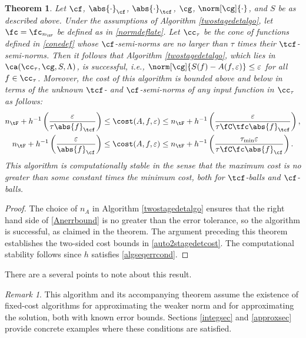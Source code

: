 \documentclass[]{elsarticle}
\newtheorem{theorem}{Theorem}
\theoremstyle{definition}
\theoremstyle{remark}
\newtheorem{rem}{Remark}
\newcommand{\Fnorm}[1]{\abs{#1}_{\cf}}
\newcommand{\Ftnorm}[1]{\abs{#1}_{\tcf}}
\newcommand{\Gnorm}[1]{\norm[\cg]{#1}}
\begin{document}
\begin{theorem}  \label{TwoStageDetermThm}  Let $\cf$, $\Fnorm{\cdot}$, $\Ftnorm{\cdot}$, $\cg$, $\Gnorm{\cdot}$, and $S$ be as described above.  Under the assumptions of Algorithm  \ref{twostagedetalgo}, let $\fc=\fc_{n_{\tF}}$ be defined as in \eqref{normdeflate}.
Let $\cc_\tau$ be the cone of functions defined in \eqref{conedef} whose $\cf$-semi-norms are no larger than $\tau$ times their $\tcf$-semi-norms.  Then it follows that Algorithm \ref{twostagedetalgo}, which lies in $\ca(\cc_{\tau},\cg,S,\Lambda)$, is successful,  i.e.,  $\norm[\cg]{S(f)-A(f,\varepsilon)} \le \varepsilon$ for all $f \in \cc_\tau$.  Moreover, the cost of this algorithm is bounded above and below in terms of the unknown $\tcf$- and $\cf$-semi-norms of any input function in $\cc_{\tau}$ as follows:
\begin{subequations}  \label{auto2stagedetcost}
\begin{gather}
n_{\tF}+ h^{-1}\left(\frac{\varepsilon}{\tau \Ftnorm{f}} \right) \le 
\cost(A,f,\varepsilon)
\le n_{\tF}+ h^{-1}\left(\frac{\varepsilon}{\tau \fC\tfc\Ftnorm{f}}\right), \\
n_{\tF}+ h^{-1}\left(\frac{\varepsilon}{\Fnorm{f}} \right) \le \cost(A,f,\varepsilon)
\le n_{\tF}+h^{-1}\left(\frac{\tau_{\min}\varepsilon}{\tau \fC\fc\Fnorm{f}}\right).
\end{gather}
\end{subequations}
This algorithm is computationally stable in the sense that the maximum cost is no greater than some constant times the minimum cost, both for $\tcf$-balls and $\cf$-balls.
\end{theorem}

\begin{proof} The choice of $n_A$ in Algorithm \ref{twostagedetalgo} ensures that the right hand side of \eqref{Anerrbound} is no greater than the error tolerance, so the algorithm is successful, as claimed in the theorem.  The argument preceding this theorem establishes the two-sided cost bounds in \eqref{auto2stagedetcost}. The computational stability follows since $h$ satisfies \eqref{algseqerrcond}.
\end{proof}

There are a several points to note about this result.

\begin{rem} This algorithm and its accompanying theorem assume the existence of fixed-cost algorithms for approximating the weaker norm and for approximating the solution, both with known error bounds. Sections \ref{integsec} and \ref{approxsec} provide concrete examples where these conditions are satisfied.
\end{rem}
\end{document}
